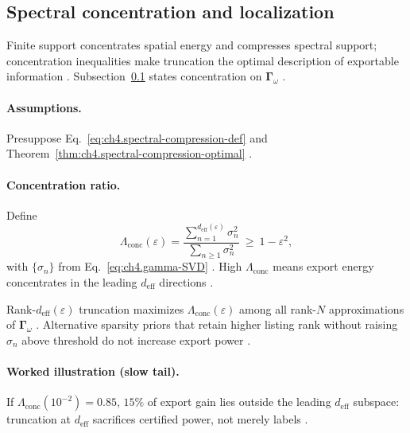 \subsection{Spectral concentration and localization}
\label{sec:ch483}

Finite support concentrates spatial energy and compresses spectral support; concentration inequalities make truncation the optimal
description of exportable information \cite{stratton1941,jackson1999,hansen1988}. Subsection~\ref{sec:ch483} states concentration on
\(\boldsymbol{\Gamma}_\omega\) \cite{harrington2001,devaney2004}.

\paragraph{Assumptions.}
Presuppose Eq.~\eqref{eq:ch4.spectral-compression-def} and Theorem~\ref{thm:ch4.spectral-compression-optimal}
\cite{stratton1941,harrington2001,hansen1988}.

\paragraph{Concentration ratio.}
Define
\begin{equation}
\label{eq:ch4.spectral-concentration-ratio}
\Lambda_{\mathrm{conc}}(\varepsilon)
=
\frac{\sum_{n=1}^{d_{\mathrm{eff}}(\varepsilon)}\sigma_{n}^{2}}
{\sum_{n\ge1}\sigma_{n}^{2}}
\ \ge\
1-\varepsilon^{2},
\end{equation}
with \(\{\sigma_{n}\}\) from Eq.~\eqref{eq:ch4.gamma-SVD} \cite{harrington2001,hansen1988}. High \(\Lambda_{\mathrm{conc}}\) means
export energy concentrates in the leading \(d_{\mathrm{eff}}\) directions \cite{stratton1941,devaney2004}.

\begin{proposition}
\label{prop:ch4.truncation-concentration}
Rank-\(d_{\mathrm{eff}}(\varepsilon)\) truncation maximizes \(\Lambda_{\mathrm{conc}}(\varepsilon)\) among all rank-\(N\) approximations
of \(\boldsymbol{\Gamma}_\omega\) \cite{harrington2001,devaney2004,stratton1941}. Alternative sparsity priors that retain higher
listing rank without raising \(\sigma_{n}\) above threshold do not increase export power \cite{hansen1988}.
\end{proposition}

\paragraph{Worked illustration (slow tail).}
If \(\Lambda_{\mathrm{conc}}(10^{-2})=0.85\), \(15\%\) of export gain lies outside the leading \(d_{\mathrm{eff}}\) subspace: truncation
at \(d_{\mathrm{eff}}\) sacrifices certified power, not merely labels \cite{harrington2001,hansen1988}.

